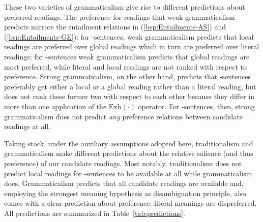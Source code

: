 \documentclass[fleqn,reqno,10pt]{article}
\newcommand{\as}{\acro{as}}
\renewcommand{\es}{\acro{es}}
\newcommand{\exh}{\ensuremath{\mathrm{Exh}}}
\begin{document}
These two varieties of grammaticalism give rise to different
predictions about preferred readings. The preference for readings that
weak grammaticalism predicts mirrors the entailment relations in
(\ref{bsp:Entailments-AS}) and (\ref{bsp:Entailments-GE}): for
\as-sentences, weak grammaticalism predicts that local readings are
preferred over global readings which in turn are preferred over
literal readings; for \es-sentences weak grammaticalism predicts that
global readings are most preferred, while literal and local readings
are not ranked with respect to preference. Strong grammaticalism, on
the other hand, predicts that \as-sentences preferably get either a
local or a global reading rather than a literal reading, but does not
rank these former two with respect to each other because they differ
in more than one application of the $\exh(\cdot)$ operator. For
\es-sentences, then, strong grammaticalism does not predict \emph{any}
preference relations between candidate readings at all.

\medskip

Taking stock, under the auxiliary assumptions adopted here,
traditionalism and grammaticalism make different predictions about the
relative salience (and thus preference) of our candidate
readings. Most notably, traditionalism does not predict local readings
for \es-sentences to be available at all while grammaticalism does.
Grammaticalism predicts that all candidate readings are available and,
employing the strongest meaning hypothesis as disambiguation
principle, also comes with a clear prediction about preference:
literal meanings are dispreferred.  All predictions are summarized in
Table~\ref{tab:predictions}.
\end{document}
